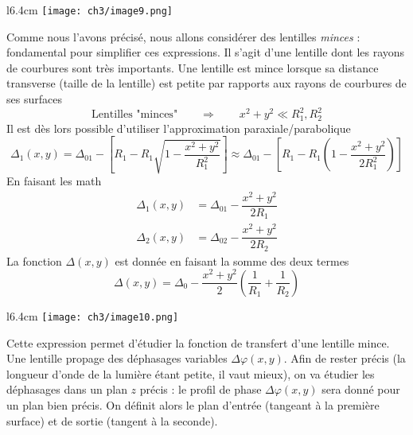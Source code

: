 	\begin{wrapfigure}[9]{l}{6.4cm}
	\vspace{-5mm}
	\texttt{[image: ch3/image9.png]}
	\end{wrapfigure}	
	Comme nous l'avons précisé, nous allons considérer des lentilles \textit{minces} : fondamental 
	pour simplifier ces expressions. Il s'agit d'une lentille dont les rayons de courbures sont 
	très importants. Une lentille est mince lorsque sa distance transverse (taille de la lentille) 
	est petite par rapports aux rayons de courbures de ses surfaces 
	\begin{equation}
	\text{Lentilles "minces"} \qquad\Longrightarrow\qquad x^2+y^2 \ll R_1^2,R_2^2
	\end{equation}
	Il est dès lors possible d'utiliser l'approximation paraxiale/parabolique 
	\begin{equation}
	\Delta_1(x,y) = \Delta_{01}-\left[R_1-R_1\sqrt{1-\dfrac{x^2+y^2}{R_1^2}}\right] \approx \Delta_{01} -
	\left[R_1-R_1\left(1-\dfrac{x^2+y^2}{2R_1^2}\right)\right]
	\end{equation}
	En faisant les math
	\begin{equation}
	\begin{array}{ll}
	\Delta_1(x,y) &= \Delta_{01} - \dfrac{x^2+y^2}{2R_1}\\
	\Delta_2(x,y) &= \Delta_{02} - \dfrac{x^2+y^2}{2R_2}
	\end{array}
	\end{equation}
	La fonction $\Delta(x,y)$ est donnée en faisant la somme des deux termes
	\begin{equation}
	\Delta(x,y) = \Delta_0-\dfrac{x^2+y^2}{2}\left(\frac{1}{R_1}+\frac{1}{R_2}\right)
	\end{equation}
	
		\begin{wrapfigure}[9]{l}{6.4cm}
	\vspace{-5mm}
	\texttt{[image: ch3/image10.png]}
	\end{wrapfigure}	
	Cette expression permet d'étudier la fonction de transfert d'une lentille mince. Une lentille 
	propage des déphasages variables $\Delta \varphi(x,y)$. Afin de rester précis (la longueur d'onde 
	de la lumière étant petite, il vaut mieux), on va étudier 	les déphasages dans un plan $z$ précis : 
	le profil de phase $\Delta\varphi(x,y)$ sera donné pour un plan bien précis. On définit alors le plan 
	d'entrée (tangeant à la première surface) et de sortie (tangent à la seconde). 
	

